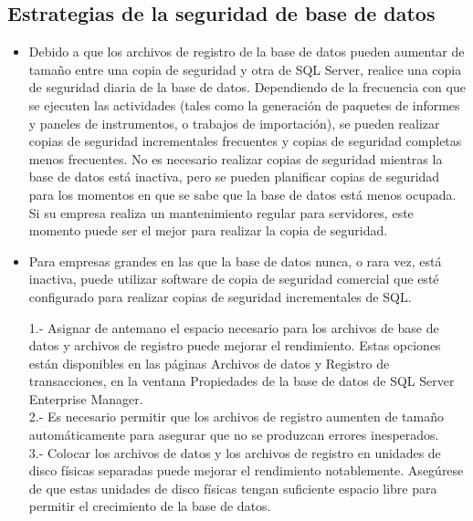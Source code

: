 \documentclass[%
 reprint,
 amsmath,amssymb,
 aps,
]{revtex4-1}
\begin{document}
\subsection{Estrategias de la seguridad de base de datos}

\begin{itemize}
	\item Debido a que los archivos de registro de la base de datos pueden aumentar de tamaño entre una copia de seguridad y otra de SQL Server, realice una copia de seguridad diaria de la base de datos. Dependiendo de la frecuencia con que se ejecuten las actividades (tales como la generación de paquetes de informes y paneles de instrumentos, o trabajos de importación), se pueden realizar copias de seguridad incrementales frecuentes y copias de seguridad completas menos frecuentes. No es necesario realizar copias de seguridad mientras la base de datos está inactiva, pero se pueden planificar copias de seguridad para los momentos en que se sabe que la base de datos está menos ocupada. Si su empresa realiza un mantenimiento regular para servidores, este momento puede ser el mejor para realizar la copia de seguridad.
	\item Para empresas grandes en las que la base de datos nunca, o rara vez, está inactiva, puede utilizar software de copia de seguridad comercial que esté configurado para realizar copias de seguridad incrementales de SQL.\cite{oracle}

1.- Asignar de antemano el espacio necesario para los archivos de base de datos y archivos de registro puede mejorar el rendimiento.
 Estas opciones están disponibles en las páginas Archivos de datos y Registro de transacciones, en la ventana Propiedades de la base de datos de SQL Server Enterprise Manager.
\\
2.- Es necesario permitir que los archivos de registro aumenten de tamaño automáticamente  para asegurar que no se produzcan errores inesperados.
\\
3.- Colocar los archivos de datos y los archivos de registro en unidades de disco físicas separadas puede mejorar el rendimiento notablemente. Asegúrese de que estas unidades de disco físicas tengan suficiente espacio libre para permitir el crecimiento de la base de datos.

\end{itemize}


\end{document}
